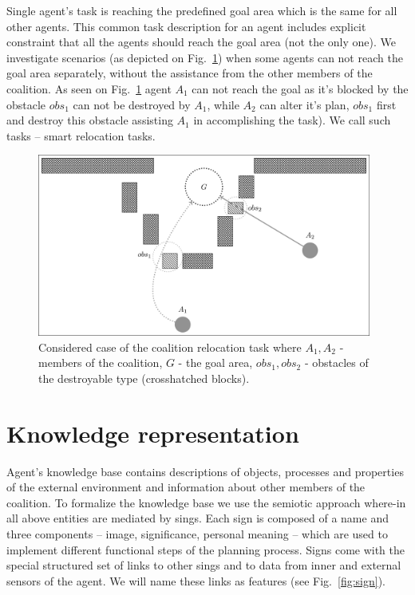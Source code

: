\documentclass[runningheads,a4paper]{llncs}
\begin{document}
Single agent's task is reaching the predefined goal area which is the same for all other agents. This common task description for an agent includes explicit constraint that all the agents should reach the goal area (not the only one). We investigate scenarios (as depicted on Fig.~\ref{fig:case}) when some agents can not reach the goal area separately, without the assistance from the other members of the coalition. As seen on Fig.~\ref{fig:case} agent $A_1$ can not reach the goal as it's blocked by the obstacle $obs_1$ can not be destroyed by $A_1$, while $A_2$ can alter it's plan, $obs_1$ first and destroy this obstacle assisting $A_1$ in accomplishing the task). We call such tasks – smart relocation tasks.

\begin{figure}
	\centering
	\includegraphics[height=6cm]{rita_example}
	\caption{Considered case of the coalition relocation task where $A_1, A_2$ - members of the coalition, $G$ - the goal area, $obs_1,obs_2$ - obstacles of the destroyable type (crosshatched blocks).}
	\label{fig:case}
\end{figure}

\section{Knowledge representation}\label{knowledge}

Agent's knowledge base contains descriptions of objects, processes and properties of the external environment and information about other members of the coalition. To formalize the knowledge base we use the semiotic approach where-in all above entities are mediated by sings.  Each sign is composed of a name and three components – image, significance, personal meaning – which are used to implement different functional steps of the planning process. Signs come with the special structured set of links to other sings and to data from inner and external sensors of the agent. We will name these links as features (see Fig.~\ref{fig:sign}).
\end{document}
